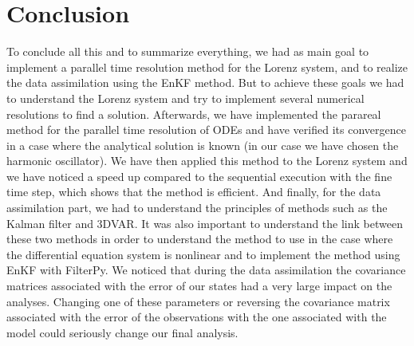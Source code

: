 \documentclass[12pt]{article}
\begin{document}
	\section{Conclusion}
	\noindent To conclude all this and to summarize everything, we had as main goal to implement a parallel time resolution method for the Lorenz system, and to realize the data assimilation using the EnKF method. But to achieve these goals we had to understand the Lorenz system and try to implement several numerical resolutions to find a solution. Afterwards, we have implemented the parareal method for the parallel time resolution of ODEs and have verified its convergence in a case where the analytical solution is known (in our case we have chosen the harmonic oscillator). We have then applied this method to the Lorenz system and we have noticed a speed up compared to the sequential execution with the fine time step, which shows that the method is efficient. And finally, for the data assimilation part, we had to understand the principles of methods such as the Kalman filter and 3DVAR. It was also important to understand the link between these two methods in order to understand the method to use in the case where the differential equation system is nonlinear and to implement the method using EnKF with FilterPy. We noticed that during the data assimilation the covariance matrices associated with the error of our states had a very large impact on the analyses. Changing one of these parameters or reversing the covariance matrix associated with the error of the observations with the one associated with the model could seriously change our final analysis. 
	
	\newpage
	
	\appendix
	
		
	
	\newpage	
	
	
	
\end{document}
